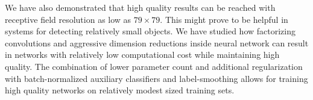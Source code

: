 \documentclass[10pt,twocolumn,letterpaper]{article}
\begin{document}
We have also demonstrated that high quality results can be reached with
receptive field resolution as low as $79\times 79$. This might prove
to be helpful in systems for detecting relatively small objects.
We have studied how factorizing convolutions and aggressive dimension
reductions inside neural network can result in networks with relatively
low computational cost while maintaining high quality.
The combination of lower parameter count and additional
regularization with batch-normalized auxiliary classifiers and
label-smoothing allows for training high quality networks on relatively
modest sized training sets.
 


{\small


}
\end{document}
